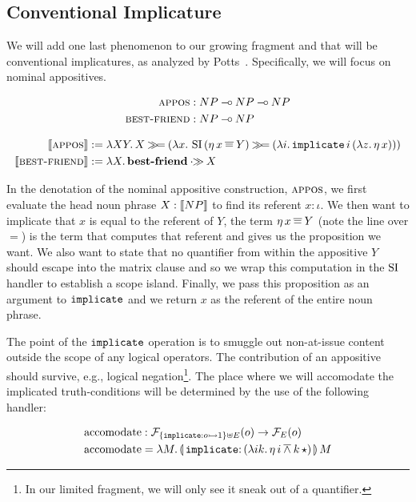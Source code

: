 \documentclass{llncs}
\begin{document}
\subsection{Conventional Implicature}
\label{ssec:ci}

We will add one last phenomenon to our growing fragment and that will be
conventional implicatures, as analyzed by
Potts~\cite{potts2005logic}. Specifically, we will focus on nominal
appositives.

\begin{align*}
  \textsc{appos} &: NP \mathbin{{-}\mkern-3.5mu{\circ}} NP \mathbin{{-}\mkern-3.5mu{\circ}} NP \\
  \textsc{best-friend} &: NP \mathbin{{-}\mkern-3.5mu{\circ}} NP
\end{align*}

\begin{align*}
  \llbracket \textsc{appos} \rrbracket &:= \lambda X Y.\, X \mathbin{\gg\!=} (\lambda x.\, \operatorname{SI}\,(\eta\,x
          \mathbin{\overline{=}} Y) \mathbin{\gg\!=}
        (\lambda i.\, \mathtt{implicate}\,i\,(\lambda z.\, \eta\,x))) \\
  \llbracket \textsc{best-friend} \rrbracket &:= \lambda X.\, \textbf{best-friend} \mathbin{\cdot\!\!\gg} X
\end{align*}

In the denotation of the nominal appositive construction, $\textsc{appos}$, we
first evaluate the head noun phrase $X : \llbracket NP \rrbracket$ to find its referent $x
: \iota$. We then want to implicate that $x$ is equal to the referent of
$Y$, the term $\eta\,x \mathbin{\overline{=}} Y$ (note the line over $=$)
is the term that computes that referent and gives us the proposition we
want. We also want to state that no quantifier from within the appositive
$Y$ should escape into the matrix clause and so we wrap this computation in
the $\operatorname{SI}$ handler to establish a scope island. Finally, we pass this
proposition as an argument to $\mathtt{implicate}$ and we return $x$ as the
referent of the entire noun phrase.

The point of the $\mathtt{implicate}$ operation is to smuggle out non-at-issue
content outside the scope of any logical operators. The contribution of an
appositive should survive, e.g., logical negation\footnote{In our limited
  fragment, we will only see it sneak out of a quantifier.}. The place
where we will accomodate the implicated truth-conditions will be determined
by the use of the following handler:

\begin{align*}
  \accomodate &: \FF_{\{\typedop{implicate}{o}{1}\} \uplus E}(o) \to \FF_E(o) \\
  \accomodate &= \lam{M}{\ap{\banana{\onto{\op{implicate}}{(\lam{i
            k}{\etaE{i} \dand \ap{k}{\star}})}}}{M}}
\end{align*}
\end{document}

